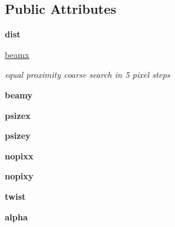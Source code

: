 \subsection*{Public Attributes}
\begin{DoxyCompactItemize}
\item 
\hypertarget{classmyDetector_1_1myDetector_a2246cf4b56f098e953bad790b34f668f}{{\bfseries dist}}\label{classmyDetector_1_1myDetector_a2246cf4b56f098e953bad790b34f668f}

\item 
\hyperlink{classmyDetector_1_1myDetector_ac7a646e99083103ff8ae1ae88755dbf8}{beamx}
\begin{DoxyCompactList}\small\item\em equal proximity coarse search in 5 pixel steps \end{DoxyCompactList}\item 
\hypertarget{classmyDetector_1_1myDetector_a1a4c1ea459d9cb1d299af5a37484974f}{{\bfseries beamy}}\label{classmyDetector_1_1myDetector_a1a4c1ea459d9cb1d299af5a37484974f}

\item 
\hypertarget{classmyDetector_1_1myDetector_aee1c732a56fbddef76f8b8b654d8b67a}{{\bfseries psizex}}\label{classmyDetector_1_1myDetector_aee1c732a56fbddef76f8b8b654d8b67a}

\item 
\hypertarget{classmyDetector_1_1myDetector_ac4bb2831ee384d8f59c2ccabf72927f1}{{\bfseries psizey}}\label{classmyDetector_1_1myDetector_ac4bb2831ee384d8f59c2ccabf72927f1}

\item 
\hypertarget{classmyDetector_1_1myDetector_ae7c12b4ce74cc80a85dae3843f8b764c}{{\bfseries nopixx}}\label{classmyDetector_1_1myDetector_ae7c12b4ce74cc80a85dae3843f8b764c}

\item 
\hypertarget{classmyDetector_1_1myDetector_a3e60d490ee58d6c5d8ccb7a7a7f24c2e}{{\bfseries nopixy}}\label{classmyDetector_1_1myDetector_a3e60d490ee58d6c5d8ccb7a7a7f24c2e}

\item 
\hypertarget{classmyDetector_1_1myDetector_a339da3a9ba68962c6acd24de484c4c36}{{\bfseries twist}}\label{classmyDetector_1_1myDetector_a339da3a9ba68962c6acd24de484c4c36}

\item 
\hypertarget{classmyDetector_1_1myDetector_a1c5fb06d769d966ed7fa68b1281b6c6b}{{\bfseries alpha}}\label{classmyDetector_1_1myDetector_a1c5fb06d769d966ed7fa68b1281b6c6b}


\end{DoxyCompactItemize}
